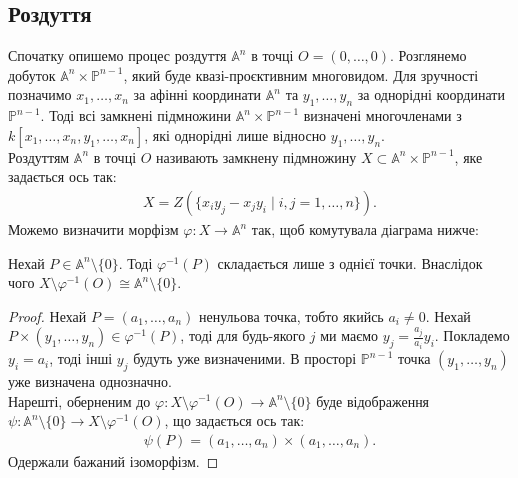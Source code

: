 \documentclass{math_library}
\begin{document}
\subsection{Роздуття}
Спочатку опишемо процес роздуття $\mathbb{A}^n$ в точці $O = (0,\dots,0)$. Розглянемо добуток $\mathbb{A}^n \times \mathbb{P}^{n-1}$, який буде квазі-проєктивним многовидом. Для зручності позначимо $x_1,\dots,x_n$ за афінні координати $\mathbb{A}^n$ та $y_1,\dots,y_n$ за однорідні координати $\mathbb{P}^{n-1}$. Тоді всі замкнені підмножини $\mathbb{A}^n \times \mathbb{P}^{n-1}$ визначені многочленами з $k[x_1,\dots,x_n,y_1,\dots,x_n]$, які однорідні лише відносно $y_1,\dots,y_n$.\\
Роздуттям $\mathbb{A}^n$ в точці $O$ називають замкнену підмножину $X \subset \mathbb{A}^n \times \mathbb{P}^{n-1}$, яке задається ось так:
\begin{align*}
X = Z(\{ x_i y_j - x_j y_i \mid i,j = 1,\dots,n \}).
\end{align*}
Можемо визначити морфізм $\varphi \colon X \to \mathbb{A}^n$ так, щоб комутувала діаграма нижче:
\begin{figure}[H]
\centering
{}
\end{figure}
\begin{lemma}
Нехай $P \in \mathbb{A}^n \setminus \{0\}$. Тоді $\varphi^{-1}(P)$ складається лише з однієї точки. Внаслідок чого $X \setminus \varphi^{-1}(O) \cong \mathbb{A}^n \setminus \{0\}$.
\end{lemma}

\begin{proof}
Нехай $P = (a_1,\dots,a_n)$ ненульова точка, тобто якийсь $a_i \neq 0$. Нехай $P \times (y_1,\dots,y_n) \in \varphi^{-1}(P)$, тоді для будь-якого $j$ ми маємо $y_j = \frac{a_j}{a_i} y_i$. Покладемо $y_i = a_i$, тоді інші $y_j$ будуть уже визначеними. В просторі $\mathbb{P}^{n-1}$ точка $(y_1,\dots,y_n)$ уже визначена однозначно.\\
Нарешті, оберненим до $\varphi \colon X \setminus \varphi^{-1}(O) \to \mathbb{A}^n \setminus \{0\}$ буде відображення $\psi \colon \mathbb{A}^n \setminus \{0\} \to X \setminus \varphi^{-1}(O)$, що задається ось так:
\begin{align*}
\psi(P) = (a_1,\dots,a_n) \times (a_1,\dots,a_n).
\end{align*}
Одержали бажаний ізоморфізм.
\end{proof}
\end{document}
